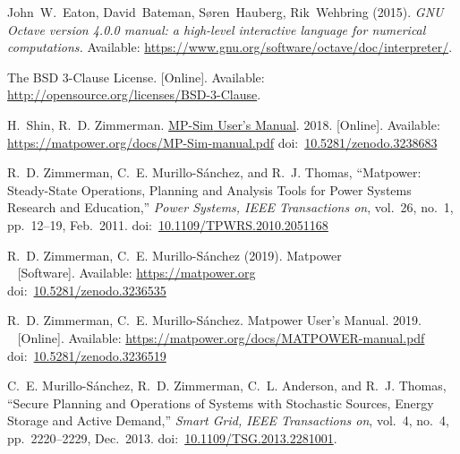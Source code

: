 \documentclass[12pt]{article}
\newcommand{\matpower}[0]{{\sc Matpower}}
\newcommand{\mpsim}[0]{{MP-Sim}}
\newcommand{\mpsimver}[0]{1.0}
\newcommand{\mpsimmanurl}[0]{https://matpower.org/docs/MP-Sim-manual-\mpsimver.pdf}
\newcommand{\mpsimman}[0]{\href{\mpsimmanurl}{\mpsim{} User's Manual}}
\newcommand{\doi}[1]{doi:~\href{https://doi.org/#1}{#1}}
\numberwithin{equation}{section}
\numberwithin{table}{section}
\numberwithin{figure}{section}
\begin{document}
\clearpage
\begin{thebibliography}{99}

John~W.~Eaton, David~Bateman, S{\o}ren~Hauberg, Rik~Wehbring (2015). \emph{GNU Octave version 4.0.0 manual: a high-level interactive language for numerical computations.} Available: \url{https://www.gnu.org/software/octave/doc/interpreter/}.

The BSD 3-Clause License. [Online]. Available: \url{http://opensource.org/licenses/BSD-3-Clause}.

H.~Shin, R.~D. Zimmerman. \mpsimman{}. 2018.
[Online]. Available: \url{https://matpower.org/docs/MP-Sim-manual.pdf}
\doi{10.5281/zenodo.3238683}

R.~D. Zimmerman, C.~E. Murillo-S{\'a}nchez, and R.~J. Thomas, ``\matpower{}: Steady-State Operations, Planning and Analysis Tools for Power Systems Research and Education,'' \emph{Power Systems, IEEE Transactions on}, vol.~26, no.~1, pp.~12--19, Feb.~2011.
\doi{10.1109/TPWRS.2010.2051168}

R.~D. Zimmerman, C.~E. Murillo-S{\'a}nchez (2019). \matpower{}\\~
[Software]. Available: \url{https://matpower.org}\\
\doi{10.5281/zenodo.3236535}

R.~D. Zimmerman, C.~E. Murillo-S{\'a}nchez. \matpower{} User's Manual. 2019.\\~
[Online]. Available: \url{https://matpower.org/docs/MATPOWER-manual.pdf}\\
\doi{10.5281/zenodo.3236519}

C.~E. Murillo-S{\'a}nchez, R.~D. Zimmerman, C.~L. Anderson, and R.~J. Thomas, ``Secure Planning and Operations of Systems with Stochastic Sources, Energy Storage and Active Demand,'' \emph{Smart Grid, IEEE Transactions on}, vol.~4, no.~4, pp.~2220--2229, Dec.~2013.
\doi{10.1109/TSG.2013.2281001}.

\end{thebibliography}
\end{document}
